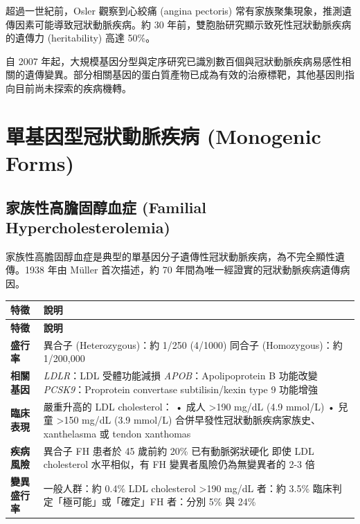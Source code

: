 \documentclass[12pt,a4paper]{article}
\begin{document}
超過一世紀前，Osler 觀察到心絞痛 (angina pectoris) 常有家族聚集現象，推測遺傳因素可能導致冠狀動脈疾病。約 30 年前，雙胞胎研究顯示致死性冠狀動脈疾病的遺傳力 (heritability) 高達 50\%。

自 2007 年起，大規模基因分型與定序研究已識別數百個與冠狀動脈疾病易感性相關的遺傳變異。部分相關基因的蛋白質產物已成為有效的治療標靶，其他基因則指向目前尚未探索的疾病機轉。

\section{單基因型冠狀動脈疾病 (Monogenic Forms)}

\subsection{家族性高膽固醇血症 (Familial Hypercholesterolemia)}

家族性高膽固醇血症是典型的單基因分子遺傳性冠狀動脈疾病，為不完全顯性遺傳。1938 年由 Müller 首次描述，約 70 年間為唯一經證實的冠狀動脈疾病遺傳病因。

\begin{longtable}{p{4cm}p{10cm}}
\toprule
\textbf{特徵} & \textbf{說明} \\
\midrule
\endfirsthead

\toprule
\textbf{特徵} & \textbf{說明} \\
\midrule
\endhead

\bottomrule
\endfoot

\textbf{盛行率} &
異合子 (Heterozygous)：約 1/250 (4/1000)\newline
同合子 (Homozygous)：約 1/200,000 \\
\midrule
\textbf{相關基因} &
\textit{LDLR}：LDL 受體功能減損\newline
\textit{APOB}：Apolipoprotein B 功能改變\newline
\textit{PCSK9}：Proprotein convertase subtilisin/kexin type 9 功能增強 \\
\midrule
\textbf{臨床表現} &
嚴重升高的 LDL cholesterol：\newline
• 成人 >190 mg/dL (4.9 mmol/L)\newline
• 兒童 >150 mg/dL (3.9 mmol/L)\newline
合併早發性冠狀動脈疾病家族史、xanthelasma 或 tendon xanthomas \\
\midrule
\textbf{疾病風險} &
異合子 FH 患者於 45 歲前約 20\% 已有動脈粥狀硬化\newline
即使 LDL cholesterol 水平相似，有 FH 變異者風險仍為無變異者的 2-3 倍 \\
\midrule
\textbf{變異盛行率} &
一般人群：約 0.4\%\newline
LDL cholesterol >190 mg/dL 者：約 3.5\%\newline
臨床判定「極可能」或「確定」FH 者：分別 5\% 與 24\% \\
\bottomrule
\end{longtable}
\end{document}
